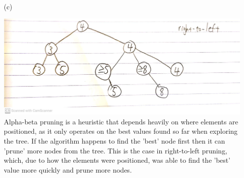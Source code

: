 \documentclass[11pt]{article}
\begin{document}
\begin{enumerate}
        \item[(c)] %
            \begin{minipage}[!htb]{\linewidth}
                \includegraphics[width=\linewidth]{images/r2l_minmax_tree} \\
                Alpha-beta pruning is a heuristic that depends heavily on where elements are positioned, as it only operates on the best values found so far when exploring the tree. If the algorithm happens to find the 'best' node first then it can 'prune' more nodes from the tree. This is the case in right-to-left pruning, which, due to how the elements were positioned, was able to find the 'best' value more quickly and prune more nodes.
            \end{minipage}
    \end{enumerate}
\end{document}
